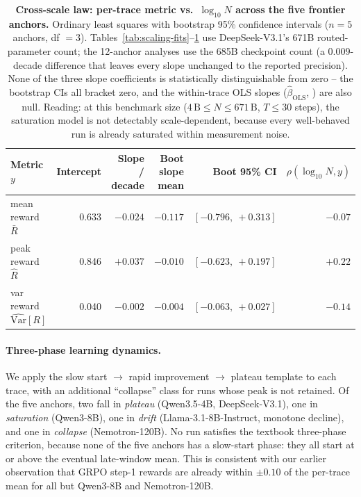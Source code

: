 \begin{table}[t]
  \centering
  \small
  \begin{tabular}{lrrrrr}
    \toprule
    Metric $y$ & Intercept & Slope / decade &
                  Boot slope mean & Boot 95\% CI &
                  $\rho(\log_{10} N, y)$ \\
    \midrule
    mean reward $\bar R$  & 0.633 & $-0.024$ & $-0.117$ & $[-0.796,\ +0.313]$ & $-0.07$ \\
    peak reward $\hat R$  & 0.846 & $\mathbf{+0.037}$ & $-0.010$ & $[-0.623,\ +0.197]$ & $+0.22$ \\
    var reward $\widehat{\text{Var}}[R]$ & 0.040 & $-0.002$ & $-0.004$ & $[-0.063,\ +0.027]$ & $-0.14$ \\
    \bottomrule
  \end{tabular}
  \caption{\textbf{Cross-scale law: per-trace metric vs.~$\log_{10} N$
    across the five frontier anchors.}
    Ordinary least squares with bootstrap 95\% confidence intervals
    ($n=5$ anchors, df $=3$).  Tables~\ref{tab:scaling-fits}--\ref{tab:scaling-cross}
    use DeepSeek-V3.1's 671B routed-parameter count; the 12-anchor
    analyses use the 685B checkpoint count (a $0.009$-decade difference
    that leaves every slope unchanged to the reported precision).
    None of the three slope coefficients is statistically
    distinguishable from zero -- the bootstrap CIs all bracket zero,
    and the within-trace OLS slopes
    ($\hat\beta_{\text{OLS}}$, ) are
    also null.  Reading: at this benchmark size ($4\,\text{B}
    \le N \le 671\,\text{B}$, $T\!\le\!30$ steps), the saturation
    model is not detectably scale-dependent, because every
    well-behaved run is already saturated within measurement noise.}
  \label{tab:scaling-cross}
\end{table}

\paragraph{Three-phase learning dynamics.}
\label{par:three-phase}
We apply the \citet{nimmaturi2025predictive} slow start
$\to$ rapid improvement $\to$ plateau template to each trace, with
an additional ``collapse'' class for runs whose peak is not
retained.  Of the five anchors, two fall in \emph{plateau}
(Qwen3.5-4B, DeepSeek-V3.1), one in \emph{saturation} (Qwen3-8B),
one in \emph{drift} (Llama-3.1-8B-Instruct, monotone decline), and
one in \emph{collapse} (Nemotron-120B).  No run satisfies the
textbook three-phase criterion, because none of the five anchors
has a slow-start phase: they all start at or above the eventual
late-window mean.  This is consistent with our earlier
observation that GRPO step-1 rewards are already within
$\pm 0.10$ of the per-trace mean for all but Qwen3-8B and
Nemotron-120B.

